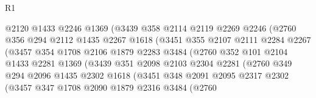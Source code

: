 \begin{lexlean}{R1}
\begin{coremodule}
                          @2120
                          @1433
                          @2246
                          @1369
                          (@3439
                            @358
                            @2114
                            @2119
                            @2269
                            @2246
                            (@2760
                              @356
                              @294
                              @2112
                              @1435
                              @2267
                              @1618
                              (@3451
                                @355
                                @2107
                                @2111
                                @2284
                                @2267
                                (@3457
                                  @354
                                  @1708
                                  @2106
                                  @1879
                                  @2283
                                  @3484
                                  (@2760
                                    @352
                                    @101
                                    @2104
                                    @1433
                                    @2281
                                    @1369
                                    (@3439
                                      @351
                                      @2098
                                      @2103
                                      @2304
                                      @2281
                                      (@2760
                                        @349
                                        @294
                                        @2096
                                        @1435
                                        @2302
                                        @1618
                                        (@3451
                                          @348
                                          @2091
                                          @2095
                                          @2317
                                          @2302
                                          (@3457
                                            @347
                                            @1708
                                            @2090
                                            @1879
                                            @2316
                                            @3484
                                            (@2760

\end{coremodule}
\end{lexlean}
